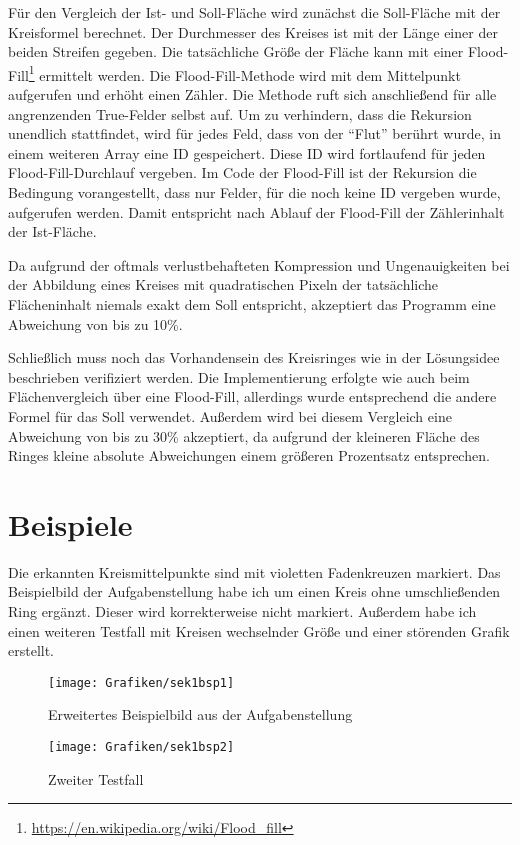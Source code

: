 Für den Vergleich der Ist- und Soll-Fläche wird zunächst die Soll-Fläche mit der Kreisformel berechnet. Der Durchmesser des Kreises ist mit der Länge einer der beiden Streifen gegeben. Die tatsächliche Größe der Fläche kann mit einer Flood-Fill\footnote{\url{https://en.wikipedia.org/wiki/Flood_fill}} ermittelt werden.
Die Flood-Fill-Methode wird mit dem Mittelpunkt aufgerufen und erhöht einen Zähler. Die Methode ruft sich anschließend für alle angrenzenden True-Felder selbst auf. Um zu verhindern, dass die Rekursion unendlich stattfindet, wird für jedes Feld, dass von der "`Flut"' berührt wurde, in einem weiteren Array eine ID gespeichert.
Diese ID wird fortlaufend für jeden Flood-Fill-Durchlauf vergeben. Im Code der Flood-Fill ist der Rekursion die Bedingung vorangestellt, dass nur Felder, für die noch keine ID vergeben wurde, aufgerufen werden. Damit entspricht nach Ablauf der Flood-Fill der Zählerinhalt der Ist-Fläche.

Da aufgrund der oftmals verlustbehafteten Kompression und Ungenauigkeiten bei der Abbildung eines Kreises mit quadratischen Pixeln der tatsächliche Flächeninhalt  niemals exakt dem Soll entspricht, akzeptiert das Programm eine Abweichung von bis zu 10\%. 

Schließlich muss noch das Vorhandensein des Kreisringes wie in der Lösungsidee beschrieben verifiziert werden. Die Implementierung erfolgte wie auch beim Flächenvergleich über eine Flood-Fill, allerdings wurde entsprechend die andere Formel für das Soll verwendet. Außerdem wird bei diesem Vergleich eine Abweichung von bis zu 30\% akzeptiert, da aufgrund der kleineren Fläche des Ringes kleine absolute Abweichungen einem größeren Prozentsatz entsprechen.

\pagebreak
\section{Beispiele}
Die erkannten Kreismittelpunkte sind mit violetten Fadenkreuzen markiert. Das Beispielbild der Aufgabenstellung habe ich um einen Kreis ohne umschließenden Ring ergänzt. Dieser wird korrekterweise nicht markiert. Außerdem habe ich einen weiteren Testfall mit Kreisen wechselnder Größe und einer störenden Grafik erstellt.
\begin{figure}[!ht]
	\centering	
	\texttt{[image: Grafiken/sek1bsp1]}
	\caption{Erweitertes Beispielbild aus der Aufgabenstellung}
\end{figure}
\vfill{}
\begin{figure}[!ht]
	\centering	
	\texttt{[image: Grafiken/sek1bsp2]}
	\caption{Zweiter Testfall}
\end{figure}
